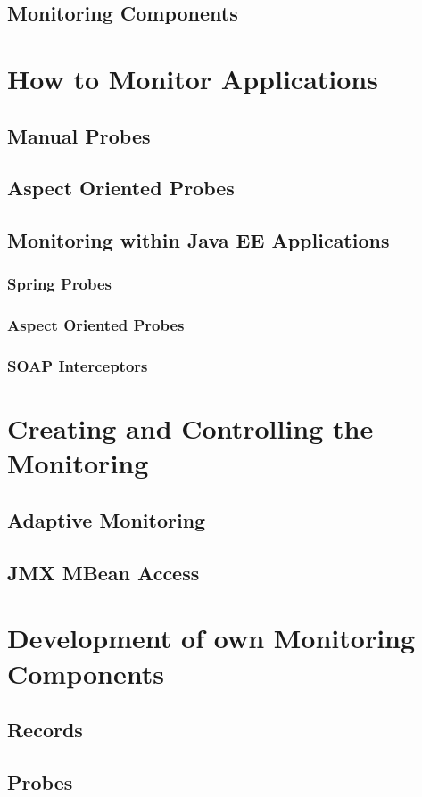 \documentclass[paper=a4,twoside=false,fontsize=11pt,numbers=noenddot,version=first,bibliography=totoc,headsepline]{scrbook}
\begin{document}
			\subsection{Monitoring Components}
		\section{How to Monitor Applications}
			\subsection{Manual Probes}
			\subsection{Aspect Oriented Probes}
			\subsection{Monitoring within Java EE Applications}
				\subsubsection{Spring Probes}
				\subsubsection{Aspect Oriented Probes}
				\subsubsection{SOAP Interceptors}
		\section{Creating and Controlling the Monitoring}
			\subsection{Adaptive Monitoring}
			\subsection{JMX MBean Access}
		\section{Development of own Monitoring Components}
			\subsection{Records}
			\subsection{Probes}
\end{document}

